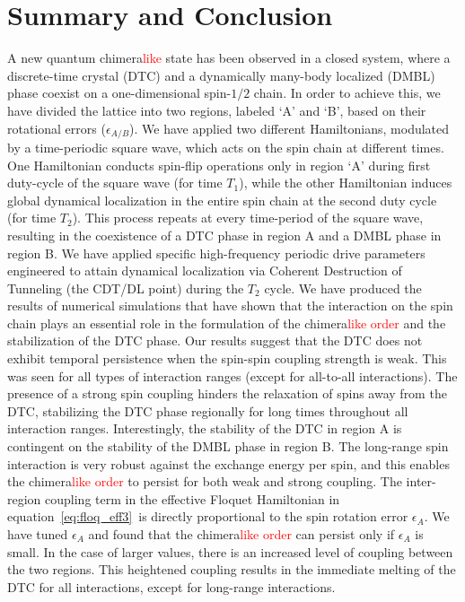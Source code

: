 \documentclass[12pt]{iopart}
\newcommand{\red}[1]{\textcolor{red}{#1}}
\begin{document}
\section{\label{sec:level7} Summary and Conclusion}
A new quantum chimera\red{like} state has been observed in a closed  system, where a discrete-time crystal (DTC) and a dynamically many-body localized (DMBL) phase coexist on a one-dimensional spin-$1/2$ chain. In order to achieve this, we have divided the lattice into two regions, labeled `A' and `B', based on their rotational errors ($\epsilon_{A/B}$). {We have applied two different Hamiltonians, modulated by a time-periodic square wave, which acts on the spin chain at different times. One Hamiltonian conducts spin-flip operations only in region `A' during first duty-cycle of the square wave (for time $T_1$), while the other Hamiltonian induces global dynamical localization in the entire spin chain at the second duty cycle (for time $T_2$). This process repeats at every time-period of the square wave, resulting in the coexistence of a DTC phase in region A and a DMBL phase in region B.} We have applied specific high-frequency periodic drive parameters engineered to attain dynamical localization via Coherent Destruction of Tunneling (the CDT/DL point) during the $T_2$ cycle. We have produced the results of numerical simulations that have shown that the interaction on the spin chain plays an essential role in the formulation of the chimera\red{like order} and the stabilization of the DTC phase. Our results suggest that the DTC does not exhibit temporal persistence when the spin-spin coupling strength is weak. This was seen for all types of interaction ranges (except for all-to-all interactions). The presence of a strong spin coupling hinders the relaxation of spins away from the DTC, stabilizing the DTC phase regionally for long times throughout all interaction ranges. Interestingly, the stability of the DTC in region A is contingent on the stability of the DMBL phase in region B. The long-range spin interaction is very robust against the exchange energy per spin, and this enables the chimera\red{like order} to persist for both weak and strong coupling. 
The inter-region coupling term in the effective Floquet Hamiltonian in equation~\ref{eq:floq_eff3} is directly proportional to the spin rotation error $\epsilon_A$. We have tuned $\epsilon_A$ and found that the chimera\red{like order} can persist only if $\epsilon_A$ is small. In the case of larger values, there is an increased level of coupling between the two regions. This heightened coupling results in the immediate melting of the DTC for all interactions, except for long-range interactions.
	
\end{document}
